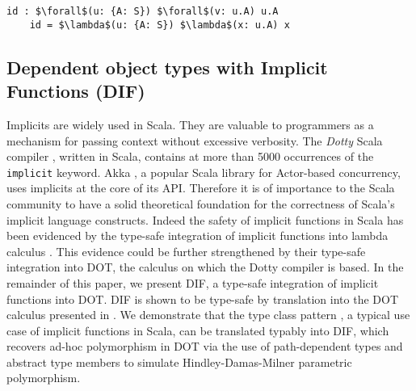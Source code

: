 \begin{minipage}{\linewidth}
\begin{lstlisting}[mathescape]
    id : $\forall$(u: {A: S}) $\forall$(v: u.A) u.A
    id = $\lambda$(u: {A: S}) $\lambda$(x: u.A) x
\end{lstlisting}
\end{minipage}

\subsection{Dependent object types with Implicit Functions (DIF)}
Implicits are widely used in Scala. They are valuable to programmers as a
mechanism for passing context without excessive verbosity. The \emph{Dotty}
Scala compiler \cite{O17}, written in Scala, contains at more than 5000
occurrences of the \texttt{implicit} keyword. Akka \cite{H12}, a popular Scala
library for Actor-based concurrency, uses implicits at the core of its API.
Therefore it is of importance to the Scala community to have a solid theoretical
foundation for the correctness of Scala's implicit language constructs. Indeed
the safety of implicit functions in Scala has been evidenced by the type-safe
integration of implicit functions into lambda calculus \cite{OBLB18}. This
evidence could be further strengthened by their type-safe integration into DOT,
the calculus on which the Dotty compiler is based. In the remainder of this
paper, we present DIF, a type-safe integration of implicit functions into DOT.
DIF is shown to be type-safe by translation into the DOT calculus presented in
\cite{AGORS16}. We demonstrate that the type class pattern \cite{OMO10}, a
typical use case of implicit functions in Scala, can be translated typably into
DIF, which recovers ad-hoc polymorphism in DOT via the use of path-dependent
types and abstract type members to simulate Hindley-Damas-Milner parametric
polymorphism.

